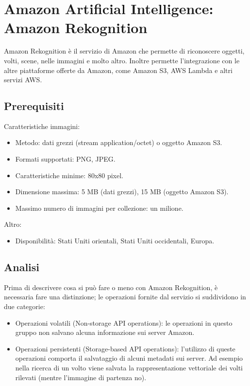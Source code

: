 \section{Amazon Artificial Intelligence: Amazon Rekognition}
Amazon Rekognition \cite{amazon-api} è il servizio di Amazon che permette di riconoscere oggetti, volti, scene, nelle immagini e molto altro.
Inoltre permette l'integrazione con le altre piattaforme offerte da Amazon, come Amazon S3, AWS Lambda e altri servizi AWS.

\subsection{Prerequisiti}
Caratteristiche immagini:
\begin{itemize}
\item Metodo: dati grezzi (stream application/octet) o oggetto Amazon S3.
\item Formati supportati: PNG, JPEG.
\item Caratteristiche minime: 80x80 pixel. 
\item Dimensione massima: 5 MB (dati grezzi), 15 MB (oggetto Amazon S3).
\item Massimo numero di immagini per collezione: un milione.
\end{itemize}
Altro:
\begin{itemize}
\item Disponibilità: Stati Uniti orientali, Stati Uniti occidentali, Europa.
\end{itemize}

\subsection{Analisi}
Prima di descrivere cosa si può fare o meno con Amazon Rekognition, è necessaria fare una distinzione; le operazioni fornite dal servizio si suddividono in due categorie:
\begin{itemize}
\item Operazioni volatili (Non-storage API operations): le operazioni in questo gruppo non salvano alcuna informazione sui server Amazon.
\item Operazioni persistenti (Storage-based API operations): l'utilizzo di queste operazioni comporta il salvataggio di alcuni metadati sui server.
Ad esempio nella ricerca di un volto viene salvata la rappresentazione vettoriale dei volti rilevati (mentre l'immagine di partenza no).
\end{itemize}

